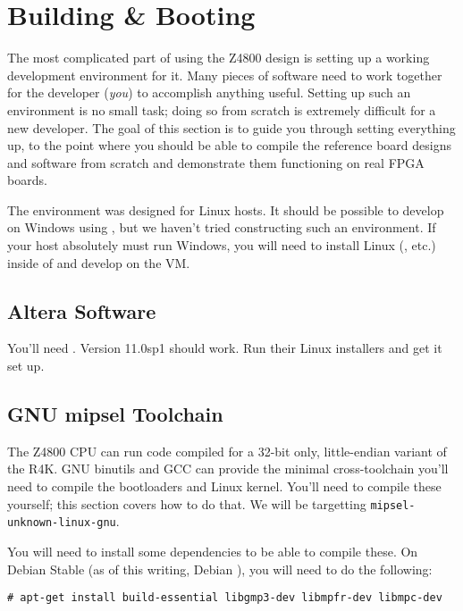 \section{Building \& Booting}

The most complicated part of using the Z4800 design is setting up a working
development environment for it. Many pieces of software need to work together
for the developer (\emph{you}) to accomplish anything useful.  Setting up such
an environment is no small task; doing so from scratch is extremely difficult
for a new developer. The goal of this section is to guide you through setting
everything up, to the point where you should be able to compile the reference
board designs and software from scratch and demonstrate them functioning on
real FPGA boards.

The environment was designed for Linux hosts. It should be possible to develop
on Windows using , but we
haven't tried constructing such an environment.  If your host absolutely must
run Windows, you will need to install Linux
(, etc.) inside of
 and develop on the
VM.

\subsection{Altera Software}

You'll need . Version 11.0sp1
should work. Run their Linux installers and get it set up.

\subsection{GNU mipsel Toolchain}
\label{subsec:toolchain}

The Z4800 CPU can run code compiled for a 32-bit only, little-endian variant of
the R4K. GNU binutils and GCC can provide the minimal cross-toolchain you'll
need to compile the bootloaders and Linux kernel. You'll need to compile these
yourself; this section covers how to do that. We will be targetting
\verb+mipsel-unknown-linux-gnu+.

You will need to install some dependencies to be able to compile these. On
Debian Stable (as of this writing, Debian ), you will need to
do the following:
\begin{verbatim}
# apt-get install build-essential libgmp3-dev libmpfr-dev libmpc-dev
\end{verbatim}

